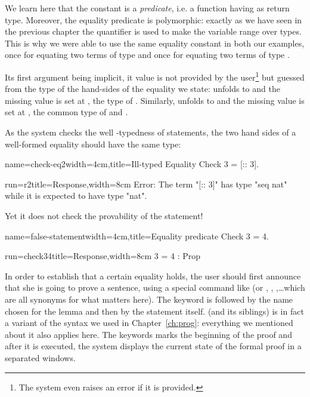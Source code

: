 We learn here that the constant  is a \emph{predicate}, i.e. a
function having  as return type. Moreover, the equality
predicate is polymorphic: exactly as we have seen in the previous
chapter the  quantifier is used to make the variable 
range over types. This is why we were able to use the same equality
constant in both our examples, once for equating two terms of type
 and once for equating two terms of type .

Its first argument being implicit, it value is not provided by the
user\footnote{The system even raises an error if it is provided.} but
guessed from the type of the hand-sides of the equality we state:  unfolds to  and the missing value is set at
, the type of . Similarly, 
unfolds to  and the missing value is set
at , the common type of  and .

As the \Coq{} system checks the well -typedness of statements,
the two hand sides of a well-formed equality should have the same
type:

\begin{coq}{name=check-eq2}{width=4cm,title=Ill-typed Equality}
Check 3 = [:: 3].
$~$
\end{coq}
\begin{coqout}{run=r2}{title=Response,width=8cm}
Error: The term "[:: 3]" has type "seq nat"
 while it is expected to have type "nat".
\end{coqout}

Yet it does not check the provability of the statement!

\begin{coq}{name=false-statement}{width=4cm,title=Equality predicate}
Check 3 = 4.
\end{coq}
\begin{coqout}{run=check34}{title=Response,width=8cm}
3 = 4 : Prop
\end{coqout}

In order to establish that a certain equality holds, the user should
first announce that she is going to prove a sentence, using a special
command like  (or , ,
,\dots which are all synonyms for what matters here).
The  keyword is followed by the name chosen for the lemma and
then by the statement itself.  (and its siblings) is in fact
a variant of the  syntax we used in
Chapter~\ref{ch:prog}: everything we mentioned about it also applies
here. The  keywords marks the beginning of the proof and
after it is executed, the system displays the current state of the
formal proof in a separated windows.

